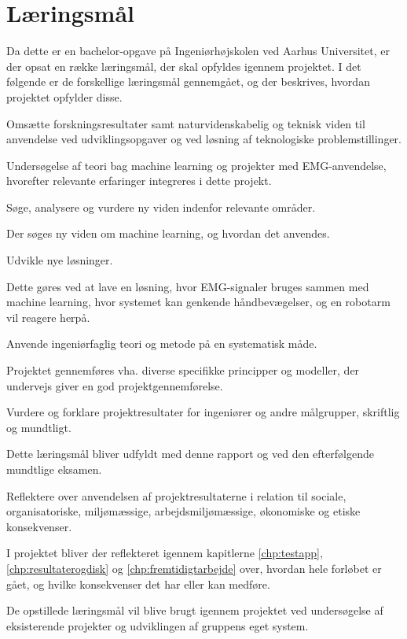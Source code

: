 \section{Læringsmål}
Da dette er en bachelor-opgave på Ingeniørhøjskolen ved Aarhus Universitet, er der opsat en række læringsmål, der skal opfyldes igennem projektet. I det følgende er de forskellige læringsmål gennemgået, og der beskrives, hvordan projektet opfylder disse.
\begin{myItemize}
	\item Omsætte forskningsresultater samt naturvidenskabelig og teknisk viden til anvendelse ved udviklingsopgaver og ved løsning af teknologiske problemstillinger.
	\begin{myItemize}
		\item Undersøgelse af teori bag machine learning og projekter med EMG-anvendelse, hvorefter relevante erfaringer integreres i dette projekt.
	\end{myItemize}
	\item Søge, analysere og vurdere ny viden indenfor relevante områder.
	\begin{myItemize}
		\item Der søges ny viden om machine learning, og hvordan det anvendes. 
	\end{myItemize}
	\item Udvikle nye løsninger.
	\begin{myItemize}
		\item Dette gøres ved at lave en løsning, hvor EMG-signaler bruges sammen med machine learning, hvor systemet kan genkende håndbevægelser, og en robotarm vil reagere herpå.
	\end{myItemize}
	\item Anvende ingeniørfaglig teori og metode på en systematisk måde.
	\begin{myItemize}
		\item Projektet gennemføres vha. diverse specifikke principper og modeller, der undervejs giver en god projektgennemførelse.
	\end{myItemize}
	\item Vurdere og forklare projektresultater for ingeniører og andre målgrupper, skriftlig og mundtligt.
	\begin{myItemize}
		\item Dette læringsmål bliver udfyldt med denne rapport og ved den efterfølgende mundtlige eksamen.
	\end{myItemize}
	\item Reflektere over anvendelsen af projektresultaterne i relation til sociale, organisatoriske, miljømæssige, arbejdsmiljømæssige, økonomiske og etiske konsekvenser.
	\begin{myItemize}
		\item I projektet bliver der reflekteret igennem kapitlerne \ref{chp:testapp}, \ref{chp:resultaterogdisk} og \ref{chp:fremtidigtarbejde} over, hvordan hele forløbet er gået, og hvilke konsekvenser det har eller kan medføre.
	\end{myItemize}
\end{myItemize}

De opstillede læringsmål vil blive brugt igennem projektet ved undersøgelse af eksisterende projekter og udviklingen af gruppens eget system.\\